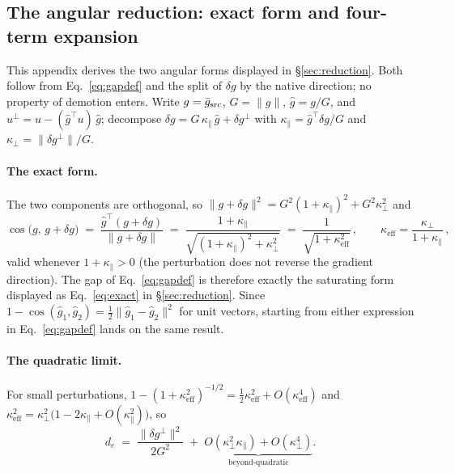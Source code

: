 \subsection{The angular reduction: exact form and four-term expansion}
\label{app:geometry}

This appendix derives the two angular forms displayed in
\S\ref{sec:reduction}. Both follow from Eq.~\ref{eq:gapdef} and the
split of $\delta g$ by the native direction; no property of demotion
enters. Write $g = \bar g_{\mathrm{src}}$, $G = \|g\|$, $\hat g = g/G$, and
$u^{\perp} = u - (\hat g^{\!\top}u)\,\hat g$; decompose
$\delta g = G\,\kappa_\parallel\, \hat g + \delta g^{\perp}$ with
$\kappa_\parallel = \hat g^{\!\top}\delta g / G$ and
$\kappa_\perp = \|\delta g^{\perp}\| / G$.

\paragraph{The exact form.} The two components are orthogonal, so
$\|g + \delta g\|^2 = G^2 (1+\kappa_\parallel)^2 + G^2 \kappa_\perp^2$
and
\begin{equation}
\cos\big(g,\, g + \delta g\big)
\;=\; \frac{\hat g^{\!\top}(g + \delta g)}{\|g + \delta g\|}
\;=\; \frac{1 + \kappa_\parallel}
{\sqrt{(1+\kappa_\parallel)^2 + \kappa_\perp^2}}
\;=\; \frac{1}{\sqrt{1 + \kappa_{\mathrm{eff}}^2}}\,,
\qquad
\kappa_{\mathrm{eff}} = \frac{\kappa_\perp}{1 + \kappa_\parallel}\,,
\label{eq:appexact}
\end{equation}
valid whenever $1 + \kappa_\parallel > 0$ (the perturbation does not
reverse the gradient direction). The gap of Eq.~\ref{eq:gapdef} is
therefore exactly the saturating form displayed as Eq.~\ref{eq:exact}
in \S\ref{sec:reduction}. Since
$1 - \cos(\hat g_1, \hat g_2) = \tfrac12 \|\hat g_1 - \hat g_2\|^2$
for unit vectors, starting from either expression in
Eq.~\ref{eq:gapdef} lands on the same result.

\paragraph{The quadratic limit.} For small perturbations,
$1 - (1 + \kappa_{\mathrm{eff}}^2)^{-1/2}
= \tfrac12 \kappa_{\mathrm{eff}}^2 + O(\kappa_{\mathrm{eff}}^4)$ and
$\kappa_{\mathrm{eff}}^2 = \kappa_\perp^2\big(1 - 2\kappa_\parallel
+ O(\kappa_\parallel^2)\big)$, so
\begin{equation}
d_e \;=\; \frac{\|\delta g^{\perp}\|^2}{2 G^2}
\;+\; \underbrace{O(\kappa_\perp^2 \kappa_\parallel)
+ O(\kappa_\perp^4)}_{\text{beyond-quadratic}}.
\label{eq:appquad}
\end{equation}

